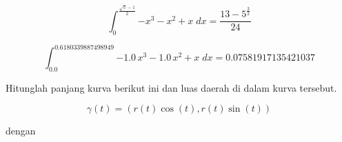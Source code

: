 \documentclass[12pt,Times new roman,letterpaper]{book}
\begin{document}
\begin{eulernootebook}
\begin{eulercomment}
\begin{eulercomment}
\begin{eulernootebook}
\begin{eulercomment}
\begin{eulercomment}
\begin{eulercomment}
\begin{eulercomment}
\begin{eulercomment}
\begin{eulercomment}
\begin{eulernotebook}
\begin{eulercomment}
\begin{eulercomment}
\begin{eulercomment}
\begin{eulercomment}
\begin{eulercomment}
\begin{eulercomment}
\begin{eulercomment}
\begin{eulercomment}
\begin{eulercomment}
\begin{eulercomment}
\begin{eulerformula}
\[\int_{0}^{\frac{\sqrt{5}-1}{2}}{-x^3-x^2+x\;dx}=\frac{13-5^{\frac{3
 }{2}}}{24}
\]
\end{eulerformula}
\begin{eulerformula}
\[
\int_{0.0}^{0.6180339887498949}{-1.0\,x^3-1.0\,x^2+x\;dx}=
 0.07581917135421037
\]
\end{eulerformula}
\begin{eulercomment}
\begin{eulercomment}
\begin{eulercomment}
Hitunglah panjang kurva berikut ini dan luas daerah di dalam kurva
tersebut.

\end{eulercomment}
\begin{eulerformula}
\[
\gamma(t)=(r(t)\cos(t),r(t)\sin(t))
\]
\end{eulerformula}
\begin{eulercomment}
dengan


\end{eulercomment}
\end{eulercomment}
\end{eulercomment}
\end{eulercomment}
\end{eulercomment}
\end{eulercomment}
\end{eulercomment}
\end{eulercomment}
\end{eulercomment}
\end{eulercomment}
\end{eulercomment}
\end{eulercomment}
\end{eulercomment}
\end{eulernotebook}
\end{eulercomment}
\end{eulercomment}
\end{eulercomment}
\end{eulercomment}
\end{eulercomment}
\end{eulercomment}
\end{eulernootebook}
\end{eulercomment}
\end{eulercomment}
\end{eulernootebook}
\end{document}
